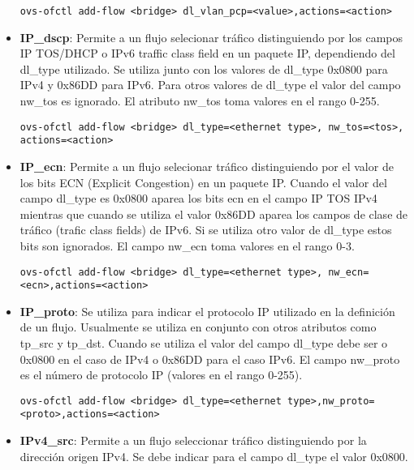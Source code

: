 \begin{itemize}
\begin{center}
\texttt{ovs-ofctl add-flow <bridge> dl\_vlan\_pcp=<value>,actions=<action>}
\end{center}

\item \textbf{IP\_dscp}: Permite a un flujo selecionar tr\'afico distinguiendo por los campos IP TOS/DHCP o IPv6 traffic class field en un paquete IP, dependiendo del dl\_type utilizado. Se utiliza junto con los valores de dl\_type 0x0800 para IPv4 y 0x86DD para IPv6. Para otros valores de dl\_type el valor del campo nw\_tos es ignorado. El atributo nw\_tos toma valores en el rango 0-255.

\begin{center}
\texttt{ovs-ofctl add-flow <bridge> dl\_type=<ethernet type>, nw\_tos=<tos>, actions=<action>}
\end{center}

\item \textbf{IP\_ecn}: Permite a un flujo selecionar tr\'afico distinguiendo por el valor de los bits ECN (Explicit Congestion) en un paquete IP. Cuando el valor del campo dl\_type es 0x0800 aparea los bits ecn en el campo IP TOS IPv4 mientras que cuando se utiliza el valor 0x86DD aparea los campos de clase de tr\'afico (trafic class fields) de IPv6. Si se utiliza otro valor de dl\_type estos bits son ignorados. El campo nw\_ecn toma valores en el rango 0-3.

\begin{center}
\texttt{ovs-ofctl add-flow <bridge> dl\_type=<ethernet type>, nw\_ecn=<ecn>,actions=<action>}
\end{center}

\item \textbf{IP\_proto}: Se utiliza para indicar el protocolo IP utilizado en la definici\'on de un flujo. Usualmente se utiliza en conjunto con otros atributos como tp\_src y tp\_dst. Cuando se utiliza el valor del campo dl\_type debe ser o 0x0800 en el caso de IPv4 o 0x86DD para el caso IPv6. El campo nw\_proto es el n\'umero de protocolo IP (valores en el rango 0-255).

\begin{center}
\texttt{ovs-ofctl add-flow <bridge> dl\_type=<ethernet type>,nw\_proto=<proto>,actions=<action>}
\end{center}

\item \textbf{IPv4\_src}: Permite a un flujo seleccionar tr\'afico distinguiendo por la dirección origen IPv4. Se debe indicar para el campo dl\_type el valor 0x0800.  


\end{itemize}
